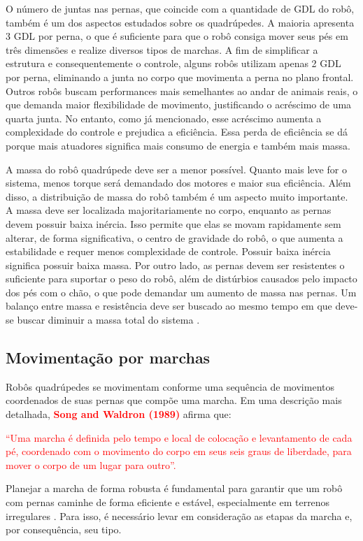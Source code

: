 \documentclass[../main.tex]{subfiles}
\begin{document}
  O número de juntas nas pernas, que coincide com a quantidade de GDL do robô, também é um dos aspectos estudados sobre os quadrúpedes. A maioria apresenta 3 GDL por perna, o que é suficiente para que o robô consiga mover seus pés em três dimensões e realize diversos tipos de marchas. A fim de simplificar a estrutura e consequentemente o controle, alguns robôs utilizam apenas 2 GDL por perna, eliminando a junta no corpo que movimenta a perna no plano frontal. Outros robôs buscam performances mais semelhantes ao andar de animais reais, o que demanda maior flexibilidade de movimento, justificando o acréscimo de uma quarta junta. No entanto, como já mencionado, esse acréscimo aumenta a complexidade do controle e prejudica a eficiência. Essa perda de eficiência se dá porque mais atuadores significa mais consumo de energia e também mais massa. 
  
  A massa do robô quadrúpede deve ser a menor possível. Quanto mais leve for o sistema, menos torque será demandado dos motores e maior sua eficiência. Além disso, a distribuição de massa do robô também é um aspecto muito importante. A massa deve ser localizada majoritariamente no corpo, enquanto as pernas devem possuir baixa inércia. Isso permite que elas se movam rapidamente sem alterar, de forma significativa, o centro de gravidade do robô, o que aumenta a estabilidade e requer menos complexidade de controle. Possuir baixa inércia significa possuir baixa massa. Por outro lado, as pernas devem ser resistentes o suficiente para suportar o peso do robô, além de distúrbios causados pelo impacto dos pés com o chão, o que pode demandar um aumento de massa nas pernas. Um balanço entre massa e resistência deve ser buscado ao mesmo tempo em que deve-se buscar diminuir a massa total do sistema \cite{Zhong2019}.

  \subsection{Movimentação por marchas}
  Robôs quadrúpedes se movimentam conforme uma sequência de movimentos coordenados de suas pernas que compõe uma marcha. Em uma descrição mais detalhada, \textbf{\textcolor{red}{Song and Waldron (1989)}} afirma que: 

  \textcolor{red}{“Uma marcha é definida pelo tempo e local de colocação e levantamento de cada pé, coordenado com o movimento do corpo em seus seis graus de liberdade, para mover o corpo de um lugar para outro”.}
  
  Planejar a marcha de forma robusta é fundamental para garantir que um robô com pernas caminhe de forma eficiente e estável, especialmente em terrenos irregulares \cite{X.129}. Para isso, é necessário levar em consideração as etapas da marcha e, por consequência, seu tipo.
  
\end{document}
